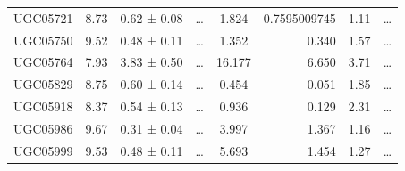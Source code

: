 \documentclass[reprint,%
 amsmath,amssymb,
 aps,
]{revtex4-1}
\begin{document}
\begin{table}[]
\begin{tabular}{cccccrrc}
\rowcolor[HTML]{F3F3F3} 
UGC05721             & 8.73                      & 0.62 ± 0.08           & …                      & 1.824                                                        & 0.7595009745                                                          & 1.11                                                            & …                                                             \\
\rowcolor[HTML]{F3F3F3} 
UGC05750             & 9.52                      & 0.48 ± 0.11           & …                      & 1.352                                                        & 0.340                                                          & 1.57                                                          & …                                                             \\
\rowcolor[HTML]{F3F3F3} 
UGC05764             & 7.93                      & 3.83 ± 0.50           & …                      & 16.177                                                       & 6.650                                                          & 3.71                                                           & …                                                             \\
\rowcolor[HTML]{F3F3F3} 
UGC05829             & 8.75                      & 0.60 ± 0.14           & …                      & 0.454                                                        & 0.051                                                        & 1.85                                                            & …                                                             \\
\rowcolor[HTML]{F3F3F3} 
UGC05918             & 8.37                      & 0.54 ± 0.13           & …                      & 0.936                                                        & 0.129                                                          & 2.31                                                           & …                                                             \\
\rowcolor[HTML]{F3F3F3} 
UGC05986             & 9.67                      & 0.31 ± 0.04           & …                      & 3.997                                                        & 1.367                                                           & 1.16                                                           & …                                                             \\
\rowcolor[HTML]{F3F3F3} 
UGC05999             & 9.53                      & 0.48 ± 0.11           & …                      & 5.693                                                        & 1.454                                                           & 1.27                                                            & …                                                             \\

\end{tabular}
\end{table}
\end{document}
